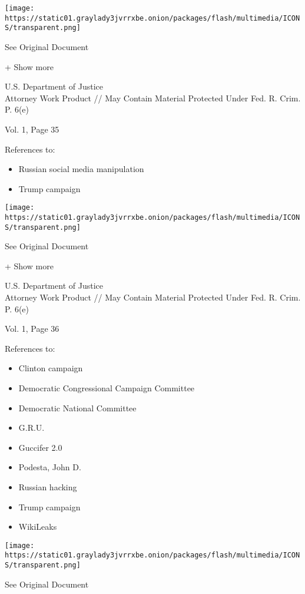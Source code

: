 \protect\hyperlink{}{}

\texttt{[image: https://static01.graylady3jvrrxbe.onion/packages/flash/multimedia/ICONS/transparent.png]}

See Original Document

+ Show more

U.S. Department of Justice\\
Attorney Work Product // May Contain Material Protected Under Fed. R.
Crim. P. 6(e)

Vol. 1, Page 35

References to:

\begin{itemize}
\tightlist
\item
  Russian social media manipulation
\item
  Trump campaign
\end{itemize}

\protect\hyperlink{}{}

\texttt{[image: https://static01.graylady3jvrrxbe.onion/packages/flash/multimedia/ICONS/transparent.png]}

See Original Document

+ Show more

U.S. Department of Justice\\
Attorney Work Product // May Contain Material Protected Under Fed. R.
Crim. P. 6(e)

Vol. 1, Page 36

References to:

\begin{itemize}
\tightlist
\item
  Clinton campaign
\item
  Democratic Congressional Campaign Committee
\item
  Democratic National Committee
\item
  G.R.U.
\item
  Guccifer 2.0
\item
  Podesta, John D.
\item
  Russian hacking
\item
  Trump campaign
\item
  WikiLeaks
\end{itemize}

\protect\hyperlink{}{}

\texttt{[image: https://static01.graylady3jvrrxbe.onion/packages/flash/multimedia/ICONS/transparent.png]}

See Original Document


